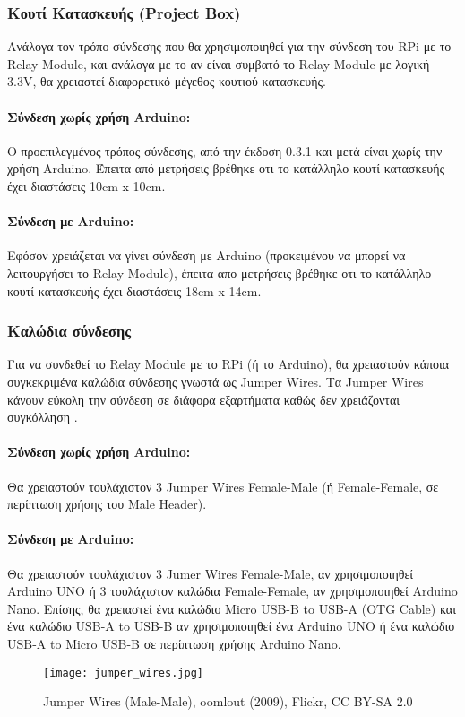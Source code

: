 		\subsubsection{Κουτί Κατασκευής (Project Box)}
			Ανάλογα τον τρόπο σύνδεσης που θα χρησιμοποιηθεί για την σύνδεση του RPi με το Relay Module, και ανάλογα με το αν είναι συμβατό το Relay Module με λογική 3.3V, θα χρειαστεί διαφορετικό μέγεθος κουτιού κατασκευής. 

			\paragraph{Σύνδεση χωρίς χρήση Arduino:}
				Ο προεπιλεγμένος τρόπος σύνδεσης, από την έκδοση 0.3.1 και μετά είναι χωρίς την χρήση Arduino. Έπειτα από μετρήσεις βρέθηκε οτι το κατάλληλο κουτί κατασκευής έχει διαστάσεις 10cm x 10cm.
			\paragraph{Σύνδεση με Arduino:}
				Εφόσον χρειάζεται να γίνει σύνδεση με Arduino (προκειμένου να μπορεί να λειτουργήσει το Relay Module), έπειτα απο μετρήσεις βρέθηκε οτι το κατάλληλο κουτί κατασκευής έχει διαστάσεις 18cm x 14cm.

		\subsubsection{Καλώδια σύνδεσης}
			Για να συνδεθεί το Relay Module με το RPi (ή το Arduino), θα χρειαστούν κάποια συγκεκριμένα καλώδια σύνδεσης γνωστά ως Jumper Wires. Τα Jumper Wires κάνουν εύκολη την σύνδεση σε διάφορα εξαρτήματα καθώς δεν χρειάζονται συγκόλληση \textsuperscript{\cite{jumper_wires}}.

		 	\paragraph{Σύνδεση χωρίς χρήση Arduino:}
		 		Θα χρειαστούν τουλάχιστον 3 Jumper Wires Female-Male (ή Female-Female, σε περίπτωση χρήσης του Male Header).
		 	\paragraph{Σύνδεση με Arduino:}
		 		Θα χρειαστούν τουλάχιστον 3 Jumer Wires Female-Male, αν χρησιμοποιηθεί Arduino UNO ή 3 τουλάχιστον καλώδια Female-Female, αν χρησιμοποιηθεί Arduino Nano. Επίσης, θα χρειαστεί ένα καλώδιο Micro USB-B to USB-A (OTG Cable) και ένα καλώδιο USB-A to USB-B αν χρησιμοποιηθεί ένα Arduino UNO ή ένα καλώδιο USB-A to Micro USB-B σε περίπτωση χρήσης Arduino Nano.

		 	\begin{figure}[h]
			\centering
				\texttt{[image: jumper\_wires.jpg]}
				\caption{Jumper Wires (Male-Male), oomlout (2009), Flickr, CC BY-SA 2.0}
			\end{figure}